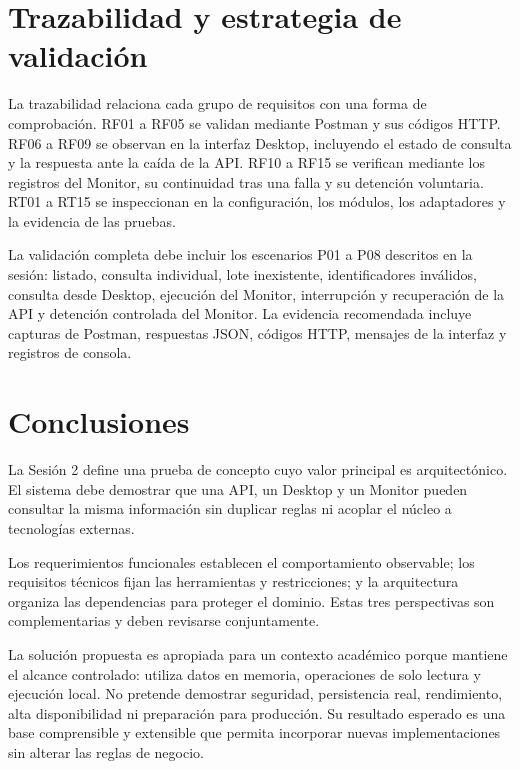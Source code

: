 \documentclass[12pt,letterpaper]{article}
\begin{document}
\section{Trazabilidad y estrategia de validación}
La trazabilidad relaciona cada grupo de requisitos con una forma de comprobación. RF01 a RF05 se validan mediante Postman y sus códigos HTTP. RF06 a RF09 se observan en la interfaz Desktop, incluyendo el estado de consulta y la respuesta ante la caída de la API. RF10 a RF15 se verifican mediante los registros del Monitor, su continuidad tras una falla y su detención voluntaria. RT01 a RT15 se inspeccionan en la configuración, los módulos, los adaptadores y la evidencia de las pruebas.

La validación completa debe incluir los escenarios P01 a P08 descritos en la sesión: listado, consulta individual, lote inexistente, identificadores inválidos, consulta desde Desktop, ejecución del Monitor, interrupción y recuperación de la API y detención controlada del Monitor. La evidencia recomendada incluye capturas de Postman, respuestas JSON, códigos HTTP, mensajes de la interfaz y registros de consola.

\section{Conclusiones}
La Sesión 2 define una prueba de concepto cuyo valor principal es arquitectónico. El sistema debe demostrar que una API, un Desktop y un Monitor pueden consultar la misma información sin duplicar reglas ni acoplar el núcleo a tecnologías externas.

Los requerimientos funcionales establecen el comportamiento observable; los requisitos técnicos fijan las herramientas y restricciones; y la arquitectura organiza las dependencias para proteger el dominio. Estas tres perspectivas son complementarias y deben revisarse conjuntamente.

La solución propuesta es apropiada para un contexto académico porque mantiene el alcance controlado: utiliza datos en memoria, operaciones de solo lectura y ejecución local. No pretende demostrar seguridad, persistencia real, rendimiento, alta disponibilidad ni preparación para producción. Su resultado esperado es una base comprensible y extensible que permita incorporar nuevas implementaciones sin alterar las reglas de negocio.
\end{document}

